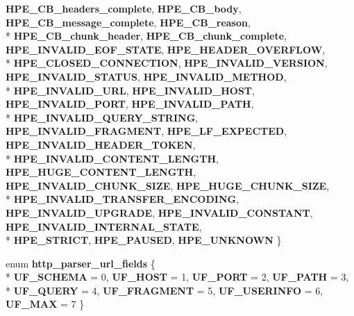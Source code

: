 \begin{DoxyCompactItemize}
{\bf H\+P\+E\+\_\+\+C\+B\+\_\+headers\+\_\+complete}, 
{\bf H\+P\+E\+\_\+\+C\+B\+\_\+body}, 
{\bf H\+P\+E\+\_\+\+C\+B\+\_\+message\+\_\+complete}, 
{\bf H\+P\+E\+\_\+\+C\+B\+\_\+reason}, 
\\*
{\bf H\+P\+E\+\_\+\+C\+B\+\_\+chunk\+\_\+header}, 
{\bf H\+P\+E\+\_\+\+C\+B\+\_\+chunk\+\_\+complete}, 
{\bf H\+P\+E\+\_\+\+I\+N\+V\+A\+L\+I\+D\+\_\+\+E\+O\+F\+\_\+\+S\+T\+A\+TE}, 
{\bf H\+P\+E\+\_\+\+H\+E\+A\+D\+E\+R\+\_\+\+O\+V\+E\+R\+F\+L\+OW}, 
\\*
{\bf H\+P\+E\+\_\+\+C\+L\+O\+S\+E\+D\+\_\+\+C\+O\+N\+N\+E\+C\+T\+I\+ON}, 
{\bf H\+P\+E\+\_\+\+I\+N\+V\+A\+L\+I\+D\+\_\+\+V\+E\+R\+S\+I\+ON}, 
{\bf H\+P\+E\+\_\+\+I\+N\+V\+A\+L\+I\+D\+\_\+\+S\+T\+A\+T\+US}, 
{\bf H\+P\+E\+\_\+\+I\+N\+V\+A\+L\+I\+D\+\_\+\+M\+E\+T\+H\+OD}, 
\\*
{\bf H\+P\+E\+\_\+\+I\+N\+V\+A\+L\+I\+D\+\_\+\+U\+RL}, 
{\bf H\+P\+E\+\_\+\+I\+N\+V\+A\+L\+I\+D\+\_\+\+H\+O\+ST}, 
{\bf H\+P\+E\+\_\+\+I\+N\+V\+A\+L\+I\+D\+\_\+\+P\+O\+RT}, 
{\bf H\+P\+E\+\_\+\+I\+N\+V\+A\+L\+I\+D\+\_\+\+P\+A\+TH}, 
\\*
{\bf H\+P\+E\+\_\+\+I\+N\+V\+A\+L\+I\+D\+\_\+\+Q\+U\+E\+R\+Y\+\_\+\+S\+T\+R\+I\+NG}, 
{\bf H\+P\+E\+\_\+\+I\+N\+V\+A\+L\+I\+D\+\_\+\+F\+R\+A\+G\+M\+E\+NT}, 
{\bf H\+P\+E\+\_\+\+L\+F\+\_\+\+E\+X\+P\+E\+C\+T\+ED}, 
{\bf H\+P\+E\+\_\+\+I\+N\+V\+A\+L\+I\+D\+\_\+\+H\+E\+A\+D\+E\+R\+\_\+\+T\+O\+K\+EN}, 
\\*
{\bf H\+P\+E\+\_\+\+I\+N\+V\+A\+L\+I\+D\+\_\+\+C\+O\+N\+T\+E\+N\+T\+\_\+\+L\+E\+N\+G\+TH}, 
{\bf H\+P\+E\+\_\+\+H\+U\+G\+E\+\_\+\+C\+O\+N\+T\+E\+N\+T\+\_\+\+L\+E\+N\+G\+TH}, 
{\bf H\+P\+E\+\_\+\+I\+N\+V\+A\+L\+I\+D\+\_\+\+C\+H\+U\+N\+K\+\_\+\+S\+I\+ZE}, 
{\bf H\+P\+E\+\_\+\+H\+U\+G\+E\+\_\+\+C\+H\+U\+N\+K\+\_\+\+S\+I\+ZE}, 
\\*
{\bf H\+P\+E\+\_\+\+I\+N\+V\+A\+L\+I\+D\+\_\+\+T\+R\+A\+N\+S\+F\+E\+R\+\_\+\+E\+N\+C\+O\+D\+I\+NG}, 
{\bf H\+P\+E\+\_\+\+I\+N\+V\+A\+L\+I\+D\+\_\+\+U\+P\+G\+R\+A\+DE}, 
{\bf H\+P\+E\+\_\+\+I\+N\+V\+A\+L\+I\+D\+\_\+\+C\+O\+N\+S\+T\+A\+NT}, 
{\bf H\+P\+E\+\_\+\+I\+N\+V\+A\+L\+I\+D\+\_\+\+I\+N\+T\+E\+R\+N\+A\+L\+\_\+\+S\+T\+A\+TE}, 
\\*
{\bf H\+P\+E\+\_\+\+S\+T\+R\+I\+CT}, 
{\bf H\+P\+E\+\_\+\+P\+A\+U\+S\+ED}, 
{\bf H\+P\+E\+\_\+\+U\+N\+K\+N\+O\+WN}
 \}
\item 
enum {\bf http\+\_\+parser\+\_\+url\+\_\+fields} \{ \\*
{\bf U\+F\+\_\+\+S\+C\+H\+E\+MA} = 0, 
{\bf U\+F\+\_\+\+H\+O\+ST} = 1, 
{\bf U\+F\+\_\+\+P\+O\+RT} = 2, 
{\bf U\+F\+\_\+\+P\+A\+TH} = 3, 
\\*
{\bf U\+F\+\_\+\+Q\+U\+E\+RY} = 4, 
{\bf U\+F\+\_\+\+F\+R\+A\+G\+M\+E\+NT} = 5, 
{\bf U\+F\+\_\+\+U\+S\+E\+R\+I\+N\+FO} = 6, 
{\bf U\+F\+\_\+\+M\+AX} = 7
 \}
\end{DoxyCompactItemize}
